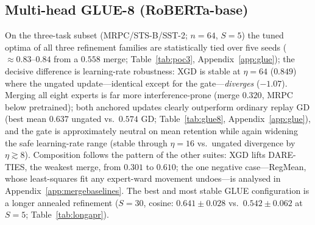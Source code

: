 \documentclass{article} %
\begin{document}
\iffalse
\subsection{Multi-head GLUE-8 (RoBERTa-base)}
\label{sec:glue}
On the three-task subset (MRPC/STS-B/SST-2; $n=64$, $S=5$) the tuned optima of all three refinement families are statistically tied over five seeds (${\approx}0.83$--$0.84$ from a $0.558$ merge; Table~\ref{tab:poc3}, Appendix~\ref{app:glue}); the decisive difference is learning-rate robustness: XGD is stable at $\eta=64$ ($0.849$) where the ungated update---identical except for the gate---\emph{diverges} ($-1.07$). Merging all eight experts is far more interference-prone (merge $0.320$, MRPC below pretrained); both anchored updates clearly outperform ordinary replay GD (best mean $0.637$ ungated vs.\ $0.574$ GD; Table~\ref{tab:glue8}, Appendix~\ref{app:glue}), and the gate is approximately neutral on mean retention while again widening the safe learning-rate range (stable through $\eta=16$ vs.\ ungated divergence by $\eta\gtrsim8$). Composition follows the pattern of the other suites: XGD lifts DARE-TIES, the weakest merge, from $0.301$ to $0.610$; the one negative case---RegMean, whose least-squares fit any expert-ward movement undoes---is analysed in Appendix~\ref{app:mergebaselines}. The best and most stable GLUE configuration is a longer annealed refinement ($S=30$, cosine: $0.641\pm0.028$ vs.\ $0.542\pm0.062$ at $S=5$; Table~\ref{tab:longapr}).
\end{document}
